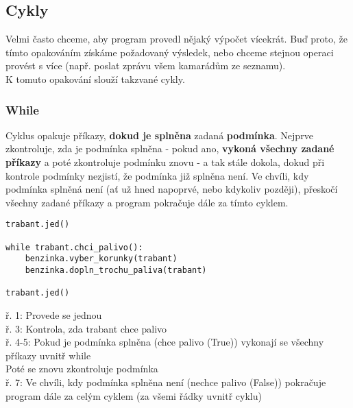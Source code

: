 \subsection{Cykly}
Velmi často chceme, aby program provedl nějaký výpočet vícekrát. Buď proto, že tímto opakováním získáme požadovaný výsledek, nebo chceme stejnou operaci provést s více  (např. poslat zprávu všem kamarádům ze seznamu).\\
K tomuto opakování slouží takzvané cykly.

\subsubsection{While}
Cyklus  opakuje příkazy, \textbf{dokud je splněna} zadaná \textbf{podmínka}. Nejprve zkontroluje, zda je podmínka splněna - pokud ano, \textbf{vykoná všechny zadané příkazy} a poté zkontroluje podmínku znovu - a tak stále dokola, dokud při kontrole podmínky nezjistí, že podmínka již splněna není. Ve chvíli, kdy podmínka splněná není (ať už hned napoprvé, nebo kdykoliv později), přeskočí všechny zadané příkazy a program pokračuje dále za tímto  cyklem.
\begin{minipage}[t]{.45\textwidth}
\begin{code}
\begin{verbatim}
trabant.jed()

while trabant.chci_palivo():
	benzinka.vyber_korunky(trabant)
	benzinka.dopln_trochu_paliva(trabant)
	
trabant.jed()	
\end{verbatim}

\label{code:while}
\end{code}
\end{minipage}
\begin{minipage}[t]{.45\textwidth}
\vspace{2.3cm}
ř. 1:	Provede se jednou\\
ř. 3:	Kontrola, zda trabant chce palivo\\
ř. 4-5:	Pokud je podmínka splněna (chce palivo (True)) vykonají se všechny příkazy uvnitř while\\Poté se znovu zkontroluje podmínka\\
ř. 7:	Ve chvíli, kdy podmínka splněna není (nechce palivo (False)) pokračuje program dále za celým cyklem (za všemi řádky uvnitř cyklu)
\end{minipage}\\


